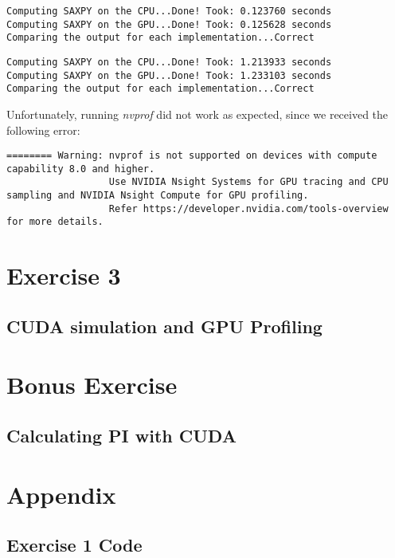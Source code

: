\documentclass[english]{exam}
\begin{document}
\begin{lstlisting}
Computing SAXPY on the CPU...Done! Took: 0.123760 seconds
Computing SAXPY on the GPU...Done! Took: 0.125628 seconds
Comparing the output for each implementation...Correct
\end{lstlisting}

\begin{lstlisting}
Computing SAXPY on the CPU...Done! Took: 1.213933 seconds
Computing SAXPY on the GPU...Done! Took: 1.233103 seconds
Comparing the output for each implementation...Correct
\end{lstlisting}

\noindent
Unfortunately, running \textit{nvprof} did not work as expected, since we received the following error:\\

\begin{lstlisting}[style=CStyle]
======== Warning: nvprof is not supported on devices with compute capability 8.0 and higher.
                  Use NVIDIA Nsight Systems for GPU tracing and CPU sampling and NVIDIA Nsight Compute for GPU profiling.
                  Refer https://developer.nvidia.com/tools-overview for more details.
\end{lstlisting}

\clearpage 
\chapter{Exercise 3}
\section*{CUDA simulation and GPU Profiling}

\clearpage 
\chapter{Bonus Exercise}
\section*{Calculating PI with CUDA}

\clearpage 
\chapter{Appendix}
\section*{Exercise 1 Code}
\end{document}
